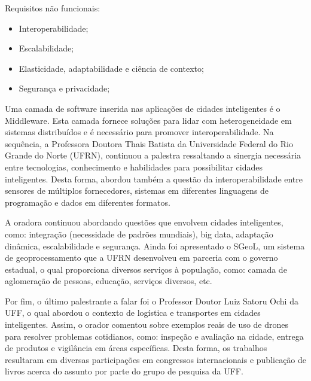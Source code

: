 Requisitos não funcionais:

\begin{itemize}
  \item Interoperabilidade;
  \item Escalabilidade;
  \item Elasticidade, adaptabilidade e ciência de contexto;
  \item Segurança e privacidade;
\end{itemize}

Uma camada de software inserida nas aplicações de cidades inteligentes é o Middleware. Esta camada fornece soluções para lidar com heterogeneidade em sistemas distribuídos e é necessário para promover interoperabilidade.
Na sequência, a Professora Doutora Thais Batista da Universidade Federal do Rio Grande do Norte (UFRN), continuou a palestra ressaltando a sinergia necessária entre tecnologias, conhecimento e habilidades para possibilitar cidades inteligentes. Desta forma, abordou também a questão da interoperabilidade entre sensores de múltiplos fornecedores, sistemas em diferentes linguagens de programação e dados em diferentes formatos.

A oradora continuou abordando questões que envolvem cidades inteligentes, como: integração (necessidade de padrões mundiais), big data, adaptação dinâmica, escalabilidade e segurança. Ainda foi apresentado o SGeoL, um sistema de geoprocessamento que a UFRN desenvolveu em parceria com o governo estadual, o qual proporciona diversos serviços à população, como: camada de aglomeração de pessoas, educação, serviços diversos, etc.

Por fim, o último palestrante a falar foi o Professor Doutor Luiz Satoru Ochi da UFF, o qual abordou o contexto de logística e transportes em cidades inteligentes. Assim, o orador comentou sobre exemplos reais de uso de drones para resolver problemas cotidianos, como: inspeção e avaliação na cidade, entrega de produtos e vigilância em áreas específicas. Desta forma, os trabalhos resultaram em diversas participações em congressos internacionais e publicação de livros acerca do assunto por parte do grupo de pesquisa da UFF.
